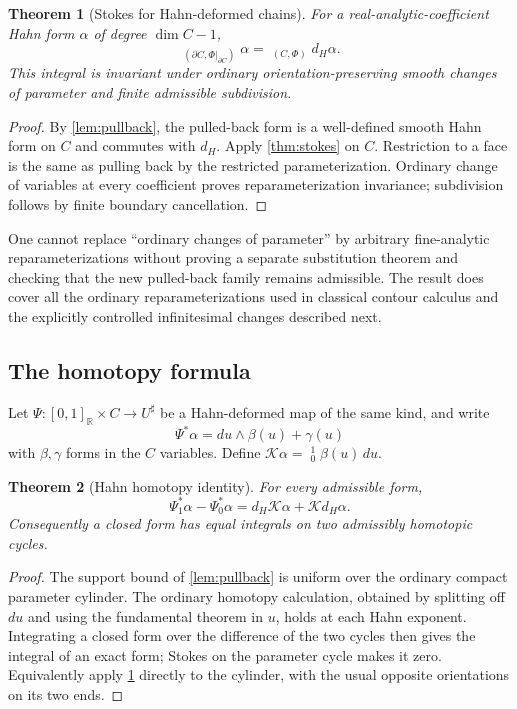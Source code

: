 \documentclass[11pt,letterpaper]{article}
\newtheorem{theorem}{Theorem}[section]
\theoremstyle{definition}
\theoremstyle{remark}
\newcommand{\R}{\mathbb R}\newcommand{\C}{\mathbb C}\newcommand{\Q}{\mathbb Q}
\newcommand{\HInt}{\mathop{\int^{\!H}}\nolimits}
\newcommand{\sh}{^{\sharp}}\newcommand{\dd}{\,d}
\numberwithin{equation}{section}
\begin{document}
\begin{theorem}[Stokes for Hahn-deformed chains]\label{thm:deformedstokes}
For a real-analytic-coefficient Hahn form $\alpha$ of degree $\dim C-1$,
\begin{equation}\label{eq:deformedstokes}
 \boxed{\qquad
 \HInt_{(\partial C,\Phi|_{\partial C})}\alpha
 =\HInt_{(C,\Phi)}d_H\alpha.
 \qquad}
\end{equation}
This integral is invariant under ordinary orientation-preserving smooth changes of parameter and finite admissible subdivision.
\end{theorem}
\begin{proof}
By \cref{lem:pullback}, the pulled-back form is a well-defined smooth Hahn form on $C$ and commutes with $d_H$. Apply \cref{thm:stokes} on $C$. Restriction to a face is the same as pulling back by the restricted parameterization. Ordinary change of variables at every coefficient proves reparameterization invariance; subdivision follows by finite boundary cancellation.
\end{proof}

One cannot replace ``ordinary changes of parameter'' by arbitrary fine-analytic reparameterizations without proving a separate substitution theorem and checking that the new pulled-back family remains admissible. The result does cover all the ordinary reparameterizations used in classical contour calculus and the explicitly controlled infinitesimal changes described next.

\subsection{The homotopy formula}
Let $\Psi:[0,1]_{\R}\times C\to U\sh$ be a Hahn-deformed map of the same kind, and write
\[
 \Psi^*\alpha=du\wedge\beta(u)+\gamma(u)
\]
with $\beta,\gamma$ forms in the $C$ variables. Define $\mathcal K\alpha=\HInt_0^1\beta(u)\dd u$.

\begin{theorem}[Hahn homotopy identity]\label{thm:homotopy}
For every admissible form,
\begin{equation}\label{eq:homotopy}
 \Psi_1^*\alpha-\Psi_0^*\alpha
 =d_H\mathcal K\alpha+\mathcal Kd_H\alpha.
\end{equation}
Consequently a closed form has equal integrals on two admissibly homotopic cycles.
\end{theorem}
\begin{proof}
The support bound of \cref{lem:pullback} is uniform over the ordinary compact parameter cylinder. The ordinary homotopy calculation, obtained by splitting off $du$ and using the fundamental theorem in $u$, holds at each Hahn exponent. Integrating a closed form over the difference of the two cycles then gives the integral of an exact form; Stokes on the parameter cycle makes it zero. Equivalently apply \cref{thm:deformedstokes} directly to the cylinder, with the usual opposite orientations on its two ends.
\end{proof}
\end{document}
